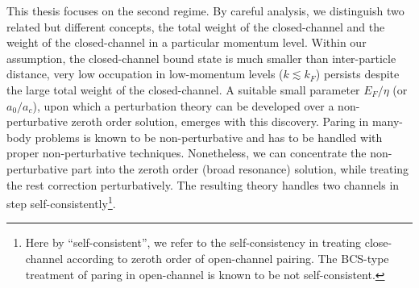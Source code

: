 This thesis focuses on the second regime.  By careful analysis, we distinguish two related but different concepts, the total weight of the closed-channel  and the weight of the closed-channel in a particular momentum level.  
       Within our assumption, the closed-channel bound state is much smaller than inter-particle distance, very low occupation in low-momentum levels ($k\lesssim{}k_{F}$) persists despite the large total weight of the closed-channel.     A suitable small parameter $E_F/\eta$ (or $a_0/a_c$), upon which a perturbation theory can be developed over a non-perturbative zeroth order solution, emerges with this discovery.  Paring in many-body problems is known to be  non-perturbative and has to be handled with proper non-perturbative techniques.  Nonetheless, we can concentrate the non-perturbative part into the zeroth order  (broad resonance) solution, while treating the rest correction perturbatively.   The resulting theory  handles two channels in step self-consistently\footnote{Here by ``self-consistent'', we refer to the self-consistency in treating close-channel according to zeroth order of open-channel pairing.  The BCS-type treatment of paring in open-channel   is known to be not self-consistent. }. 
       
